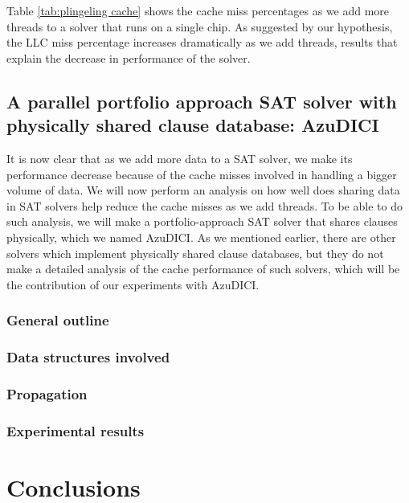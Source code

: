 \documentclass[12pt]{diicc}
\begin{document}
Table \ref{tab:plingeling cache} shows the cache miss percentages as we add more threads to a solver that runs on a single chip. As suggested by our hypothesis, the LLC miss percentage increases dramatically as we add threads, results that explain the decrease in performance of the solver.

\section{A parallel portfolio approach SAT solver with physically shared clause database: AzuDICI}

It is now clear that as we add more data to a SAT solver, we make its performance decrease because of the cache misses involved in handling a bigger volume of data. We will now perform an analysis on how well does sharing data in SAT solvers help reduce the cache misses as we add threads. To be able to do such analysis, we will make a portfolio-approach SAT solver that shares clauses physically, which we named AzuDICI. As we mentioned earlier, there are other solvers which implement physically shared clause databases, but they do not make a detailed analysis of the cache performance of such solvers, which will be the contribution of our experiments with AzuDICI.

\subsection{General outline}

\subsection{Data structures involved}

\subsection{Propagation}

\subsection{Experimental results} 

%
% 
\chapter{Conclusions}\label{chap:conclusion}

%
% 
%


\end{document}
